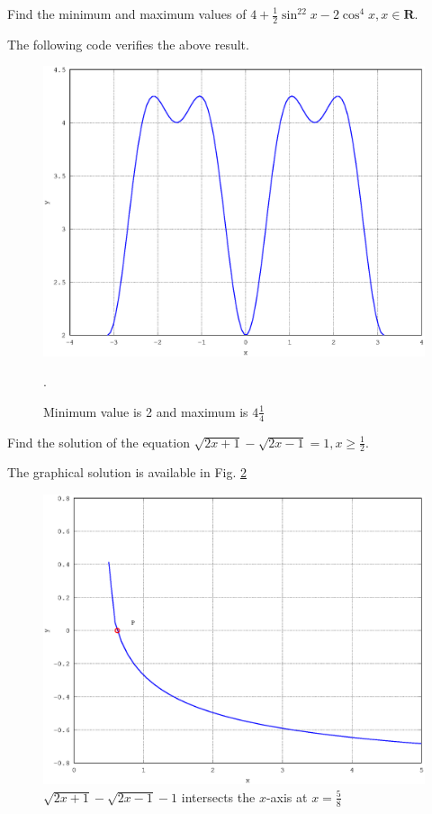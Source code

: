 \documentclass[journal,12pt,twocolumn]{IEEEtran}
\begin{document}
%
\begin{problem}
Find the minimum and maximum values of $4 + \frac{1}{2}\sin^22x - 2\cos^4 x, x \in \mathbf{R}$. 
\end{problem}
\solution 

The following code verifies the above result.

\begin{figure}[h]
\centering
\includegraphics[width=\columnwidth]{./version_2/ee16b1014/ee16b1014}
\caption{Minimum value is 2 and maximum is $4\frac{1}{4}$}.
\label{fig_14}	
\end{figure}
%
\begin{problem}
Find the solution of the equation $\sqrt{2x+1}- \sqrt{2x-1} = 1, x \geq \frac{1}{2}$.
\end{problem}
\solution

The graphical solution is available in Fig. \ref{fig_15}

\begin{figure}[h]
\centering
\includegraphics[width=\columnwidth]{./version_2/ee16b1015/ee16b1015}
\caption{ $\sqrt{2x+1}- \sqrt{2x-1} - 1$ intersects the $x$-axis at $x = \frac{5}{8}$}
\label{fig_15}	
\end{figure}
\end{document}
